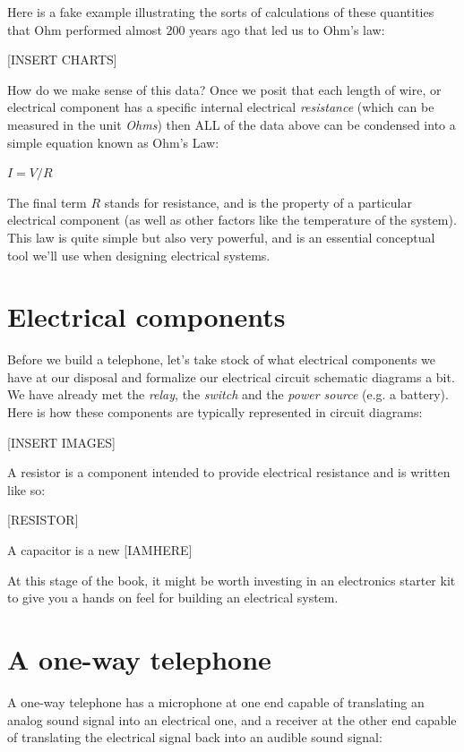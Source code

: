 \documentclass[UTF8]{book}
\begin{document}
\begin{CJK}{UTF8}{gbsn}
Here is a fake example illustrating the sorts of calculations of these quantities that Ohm performed almost 200 years ago that led us to Ohm's law:

[INSERT CHARTS]

How do we make sense of this data? Once we posit that each length of wire, or electrical component has a specific internal electrical \emph{resistance} (which can be measured in the unit \emph{Ohms}) then ALL of the data above can be condensed into a simple equation known as Ohm's Law:

$I = V/R$

The final term $R$ stands for resistance, and is the property of a particular electrical component (as well as other factors like the temperature of the system). This law is quite simple but also very powerful, and is an essential conceptual tool we'll use when designing electrical systems.

\section{Electrical components}

Before we build a telephone, let's take stock of what electrical components we have at our disposal and formalize our electrical circuit schematic diagrams a bit. We have already met the \emph{relay}, the \emph{switch} and the \emph{power source} (e.g. a battery). Here is how these components are typically represented in circuit diagrams:

[INSERT IMAGES]

A resistor is a component intended to provide electrical resistance and is written like so:

[RESISTOR]

A capacitor is a new [IAMHERE]

At this stage of the book, it might be worth investing in an electronics starter kit to give you a hands on feel for building an electrical system.



\section{A one-way telephone}

A one-way telephone has a microphone at one end capable of translating an analog sound signal into an electrical one, and a receiver at the other end capable of translating the electrical signal back into an audible sound signal:


\end{CJK}
\end{document}
